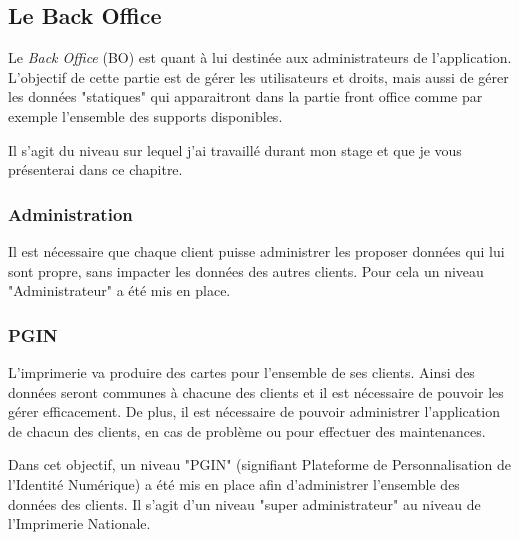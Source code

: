 
\subsection{Le Back Office}

Le \textit{Back Office} (BO) est quant à lui destinée aux administrateurs de l'application.
L'objectif de cette partie est de gérer les utilisateurs et droits, mais aussi de gérer les données "statiques" qui apparaitront dans la partie front office comme par exemple l'ensemble des supports disponibles.

Il s'agit du niveau sur lequel j'ai travaillé durant mon stage et que je vous présenterai dans ce chapitre.


\subsubsection{Administration}

Il est nécessaire que chaque client puisse administrer les proposer données qui lui sont propre, sans impacter les données des autres clients.
Pour cela un niveau "Administrateur" a été mis en place.


\subsubsection{PGIN}

L'imprimerie va produire des cartes pour l'ensemble de ses clients.
Ainsi des données seront communes à chacune des clients et il est nécessaire de pouvoir les gérer efficacement.
De plus, il est nécessaire de pouvoir administrer l'application de chacun des clients, en cas de problème ou pour effectuer des maintenances.

Dans cet objectif, un niveau "PGIN" (signifiant Plateforme de Personnalisation de l'Identité Numérique) a été mis en place afin d'administrer l'ensemble des données des clients.
Il s'agit d'un niveau "super administrateur" au niveau de l'Imprimerie Nationale.


